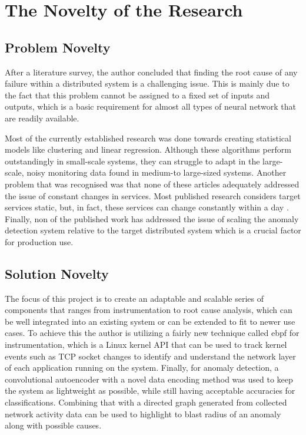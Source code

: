 \section{The Novelty of the Research}

\subsection{Problem Novelty}

After a literature survey, the author concluded that finding the root cause of any failure within a distributed system is a challenging issue. This is mainly due to the fact that this problem cannot be assigned to a fixed set of inputs and outputs, which is a basic requirement for almost all types of neural network that are readily available. 


Most of the currently established research was done towards creating statistical models like clustering and linear regression. Although these algorithms perform outstandingly in small-scale systems, they can struggle to adapt in the large-scale, noisy monitoring data found in medium-to large-sized systems. Another problem that was recognised was that none of these articles adequately addressed the issue of constant changes in services. Most published research considers target services static, but, in fact, these services can change constantly within a day \citep{GoingtoM51:online}. Finally, non of the published work has addressed the issue of scaling the anomaly detection system relative to the target distributed system which is a crucial factor for production use.

\subsection{Solution Novelty}


The focus of this project is to create an adaptable and scalable series of components that ranges from instrumentation to root cause analysis, which can be well integrated into an existing system or can be extended to fit to newer use cases. To achieve this the author is utilizing a fairly new technique called \ac{ebpf} for instrumentation, which is a Linux kernel API that can be used to track kernel events such as TCP socket changes to identify and understand the network layer of each application running on the system. Finally, for anomaly detection, a convolutional autoencoder with a novel data encoding method was used to keep the system as lightweight as possible, while still having acceptable accuracies for classifications. Combining that with a directed graph generated from collected network activity data can be used to highlight to blast radius of an anomaly along with possible causes.